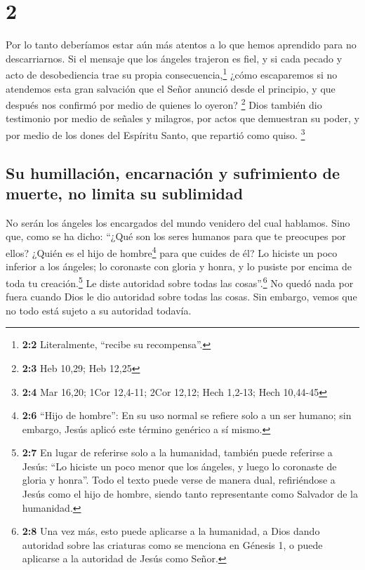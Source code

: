 \hypertarget{section-1}{%
\section{2}\label{section-1}}

 Por lo tanto deberíamos estar aún más atentos a lo que
hemos aprendido para no descarriarnos.  Si el mensaje que
los ángeles trajeron es fiel, y si cada pecado y acto de desobediencia
trae su propia consecuencia,\footnote{\textbf{2:2} Literalmente,
  ``recibe su recompensa''.}  ¿cómo escaparemos si no
atendemos esta gran salvación que el Señor anunció desde el principio, y
que después nos confirmó por medio de quienes lo oyeron? \footnote{\textbf{2:3}
  Heb 10,29; Heb 12,25}  Dios también dio testimonio por
medio de señales y milagros, por actos que demuestran su poder, y por
medio de los dones del Espíritu Santo, que repartió como quiso.
\footnote{\textbf{2:4} Mar 16,20; 1Cor 12,4-11; 2Cor 12,12; Hech 1,2-13;
  Hech 10,44-45}

\hypertarget{su-humillaciuxf3n-encarnaciuxf3n-y-sufrimiento-de-muerte-no-limita-su-sublimidad}{%
\subsection{Su humillación, encarnación y sufrimiento de muerte, no
limita su
sublimidad}\label{su-humillaciuxf3n-encarnaciuxf3n-y-sufrimiento-de-muerte-no-limita-su-sublimidad}}

 No serán los ángeles los encargados del mundo venidero
del cual hablamos.  Sino que, como se ha dicho: ``¿Qué son
los seres humanos para que te preocupes por ellos? ¿Quién es el hijo de
hombre\footnote{\textbf{2:6} ``Hijo de hombre'': En su uso normal se
  refiere solo a un ser humano; sin embargo, Jesús aplicó este término
  genérico a sí mismo.} para que cuides de él?  Lo hiciste
un poco inferior a los ángeles; lo coronaste con gloria y honra, y lo
pusiste por encima de toda tu creación.\footnote{\textbf{2:7} En lugar
  de referirse solo a la humanidad, también puede referirse a Jesús:
  ``Lo hiciste un poco menor que los ángeles, y luego lo coronaste de
  gloria y honra''. Todo el texto puede verse de manera dual,
  refiriéndose a Jesús como el hijo de hombre, siendo tanto
  representante como Salvador de la humanidad.}  Le diste
autoridad sobre todas las cosas''.\footnote{\textbf{2:8} Una vez más,
  esto puede aplicarse a la humanidad, a Dios dando autoridad sobre las
  criaturas como se menciona en Génesis 1, o puede aplicarse a la
  autoridad de Jesús como Señor.} No quedó nada por fuera cuando Dios le
dio autoridad sobre todas las cosas. Sin embargo, vemos que no todo está
sujeto a su autoridad todavía.

